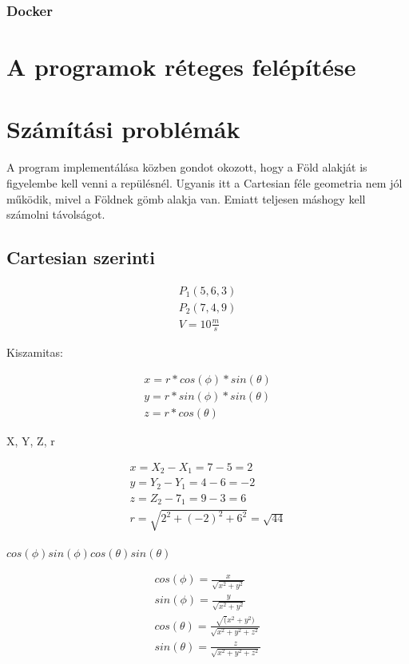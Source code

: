 \subsubsection{Docker}

\section{A programok réteges felépítése}


\section{Számítási problémák}
A program implementálása közben gondot okozott, hogy a Föld alakját is figyelembe kell venni a repülésnél.
Ugyanis itt a Cartesian féle geometria nem jól működik, mivel a Földnek gömb alakja van.
Emiatt teljesen máshogy kell számolni távolságot.
\subsection{Cartesian szerinti}
\begin{gather}
    P_1(5,6,3) \\
    P_2(7,4,9) \\
    V = 10 \frac{m}{s}
\end{gather}


Kiszamitas:

\begin{gather}
    x = r * cos(\phi) * sin(\theta) \\
    y = r * sin(\phi) * sin(\theta) \\
    z = r * cos(\theta)
\end{gather}


X, Y, Z, r

\begin{gather}
    x = X_2 - X_1 = 7 - 5 = 2 \\
    y = Y_2 - Y_1 = 4 - 6 = -2 \\
    z = Z_2 - 7_1 = 9 - 3 = 6 \\
    r = \sqrt{2^2 + (-2)^2 + 6^2} = \sqrt{44}
\end{gather}

$
cos(\phi) sin(\phi) cos(\theta) sin(\theta)
$

\begin{gather}
    cos(\phi) = \frac{x}{\sqrt{x^2 + y^2}} \\
    sin(\phi) = \frac{y}{\sqrt{x^2 + y^2}} \\
    cos(\theta) = \frac{\sqrt(x^2 + y^2)}{\sqrt{x^2 + y^2 + z^2}} \\
    sin(\theta) = \frac{z}{\sqrt{x^2 + y^2 + z^2}}
\end{gather}

